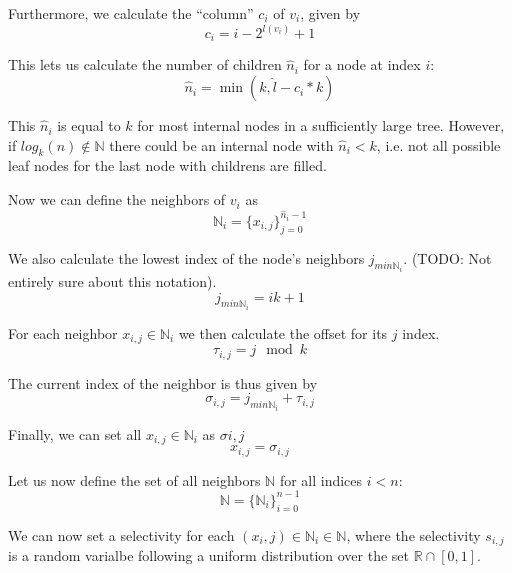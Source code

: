 Furthermore, we calculate the ``column'' $c_i$ of $v_i$, given by
\begin{equation}
    c_i = i - 2^{l(v_i)} + 1
\end{equation}

This lets us calculate the number of children $\hat{n}_i$ for a node at index $i$:
\begin{equation}
    \hat{n}_i = \min(k, \hat{l} - c_i * k)
\end{equation}

\begin{note}
    This $\hat{n}_i$ is equal to $k$ for most internal nodes in a sufficiently large tree. However, if $log_k(n) \notin \mathbb{N}$ there could be an internal node with $\hat{n}_i < k$, i.e. not all possible leaf nodes for the last node with childrens are filled.
\end{note}

Now we can define the neighbors of $v_i$ as
\begin{equation}
    \mathbb{N}_i = \{ x_{i, j} \}_{j=0}^{\hat{n}_i - 1} 
\end{equation}

We also calculate the lowest index of the node's neighbors $j_{min\mathbb{N}_i}$. (TODO: Not entirely sure about this notation).
\begin{equation}
    j_{min\mathbb{N}_i} = ik + 1
\end{equation}

For each neighbor $x_{i, j} \in \mathbb{N}_i$ we then calculate the offset for its $j$ index.
\begin{equation}
    \tau_{i,j} = j\mod{k}
\end{equation}

The current index of the neighbor is thus given by
\begin{equation}
    \sigma_{i,j} = j_{min\mathbb{N}_i} + \tau_{i,j}
\end{equation}

Finally, we can set all $x_{i, j} \in \mathbb{N}_i$ as $\sigma{i,j}$
\begin{equation}
    x_{i, j} = \sigma_{i,j}
\end{equation}

Let us now define the set of all neighbors $\mathbb{N}$ for all indices $i < n$:
\begin{equation}
    \mathbb{N} = \{\mathbb{N}_i\}_{i=0}^{n-1}
\end{equation}

We can now set a selectivity for each $(x_i,j) \in \mathbb{N}_i \in \mathbb{N}$, where the selectivity $s_{i,j}$ is a random varialbe following a uniform distribution over the set $\mathbb{R} \cap [0,1]$.

